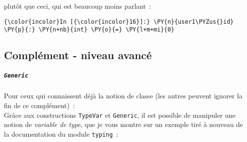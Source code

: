     plutôt que ceci, qui est beaucoup moins parlant~:

    \begin{Verbatim}[commandchars=\\\{\}]
{\color{incolor}In [{\color{incolor}16}]:} \PY{n}{user1\PYZus{}id} \PY{p}{:} \PY{n+nb}{int} \PY{o}{=} \PY{l+m+mi}{0}
\end{Verbatim}


    \hypertarget{compluxe9ment---niveau-avancuxe9}{%
\subsection{Complément - niveau
avancé}\label{compluxe9ment---niveau-avancuxe9}}

    \hypertarget{generic}{%
\subparagraph{\texorpdfstring{\texttt{Generic}}{Generic}}\label{generic}}

    Pour ceux qui connaissent déjà la notion de classe (les autres peuvent
ignorer la fin de ce complément)~:\\

    Grâce aux constructions \texttt{TypeVar} et \texttt{Generic}, il est
possible de manipuler une notion de \emph{variable de type}, que je vous
montre sur un exemple tiré à nouveau de la documentation du module
\texttt{typing}~:

